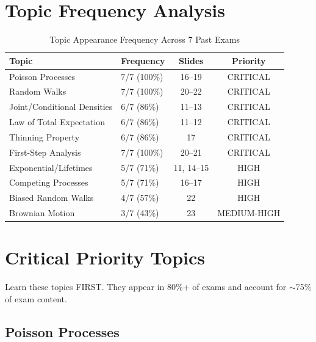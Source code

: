 \documentclass[11pt,letterpaper]{article}
\begin{document}
\newpage

\section{Topic Frequency Analysis}

\begin{table}[h]
\centering
\caption{Topic Appearance Frequency Across 7 Past Exams}
\begin{tabularx}{\textwidth}{Xlcc}
\toprule
\textbf{Topic} & \textbf{Frequency} & \textbf{Slides} & \textbf{Priority} \\
\midrule
Poisson Processes & \textcolor{criticalcolor}{7/7 (100\%)} & 16--19 & CRITICAL \\
Random Walks & \textcolor{criticalcolor}{7/7 (100\%)} & 20--22 & CRITICAL \\
Joint/Conditional Densities & \textcolor{criticalcolor}{6/7 (86\%)} & 11--13 & CRITICAL \\
Law of Total Expectation & \textcolor{criticalcolor}{6/7 (86\%)} & 11--12 & CRITICAL \\
Thinning Property & \textcolor{criticalcolor}{6/7 (86\%)} & 17 & CRITICAL \\
First-Step Analysis & \textcolor{criticalcolor}{7/7 (100\%)} & 20--21 & CRITICAL \\
Exponential/Lifetimes & \textcolor{highcolor}{5/7 (71\%)} & 11, 14--15 & HIGH \\
Competing Processes & \textcolor{highcolor}{5/7 (71\%)} & 16--17 & HIGH \\
Biased Random Walks & \textcolor{highcolor}{4/7 (57\%)} & 22 & HIGH \\
Brownian Motion & \textcolor{mediumcolor}{3/7 (43\%)} & 23 & MEDIUM-HIGH \\
\bottomrule
\end{tabularx}
\end{table}

\section{Critical Priority Topics}

\begin{criticalbox}
Learn these topics FIRST. They appear in 80\%+ of exams and account for $\sim$75\% of exam content.
\end{criticalbox}

\subsection{Poisson Processes}
\end{document}

